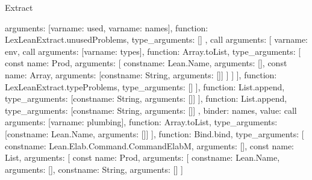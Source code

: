 \begin{lexlean}{Extract}
\begin{toolingmodule}
{{{{{{{{{{{                                arguments: [var{name: used}, var{name: names}],
                                function: LexLeanExtract.unusedProblems,
                                type_arguments: []
                              },
                              call{
                                arguments: [
                                  var{name: env},
                                  call{
                                    arguments: [var{name: types}],
                                    function: Array.toList,
                                    type_arguments: [
                                      const{
                                        name: Prod,
                                        arguments: [
                                          const{name: Lean.Name, arguments: []},
                                          const{
                                            name: Array,
                                            arguments: [const{name: String, arguments: []}]
                                          }
                                        ]
                                      }
                                    ]
                                  }
                                ],
                                function: LexLeanExtract.typeProblems,
                                type_arguments: []
                              }
                            ],
                            function: List.append,
                            type_arguments: [const{name: String, arguments: []}]
                          }
                        ],
                        function: List.append,
                        type_arguments: [const{name: String, arguments: []}]
                      }
                    },
                    binder: names,
                    value: call{
                      arguments: [var{name: plumbing}],
                      function: Array.toList,
                      type_arguments: [const{name: Lean.Name, arguments: []}]
                    }
                  }
                }
              ],
              function: Bind.bind,
              type_arguments: [
                const{name: Lean.Elab.Command.CommandElabM, arguments: []},
                const{
                  name: List,
                  arguments: [
                    const{
                      name: Prod,
                      arguments: [
                        const{name: Lean.Name, arguments: []},
                        const{name: String, arguments: []}
                      ]
                    }
}}}}}}
\end{toolingmodule}
\end{lexlean}
